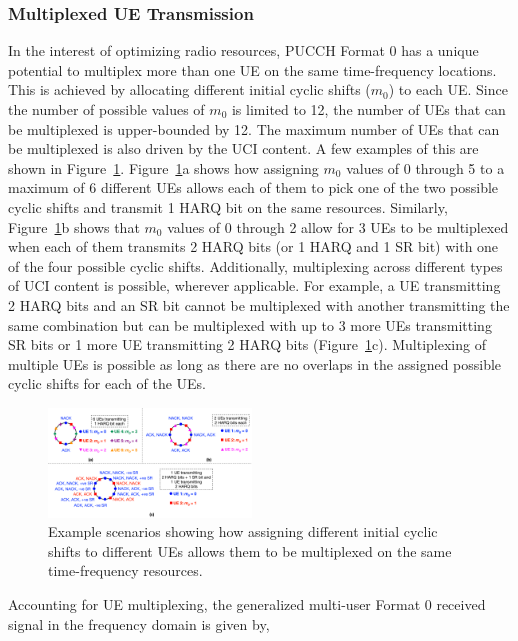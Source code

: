 \documentclass[journal]{IEEEtran}
\begin{document}
\subsubsection{Multiplexed UE Transmission}
In the interest of optimizing radio resources, PUCCH Format 0 has a unique potential to multiplex more than one UE on the same time-frequency locations. This is achieved by allocating different initial cyclic shifts ($m_0$) to each UE. Since the number of possible values of $m_0$ is limited to 12, the number of UEs that can be multiplexed is upper-bounded by 12. The maximum number of UEs that can be multiplexed is also driven by the UCI content. A few examples of this are shown in Figure~\ref{fig: m_cs_mux_ue}. Figure~\ref{fig: m_cs_mux_ue}a shows how assigning $m_0$ values of 0 through 5 to a maximum of 6 different UEs allows each of them to pick one of the two possible cyclic shifts and transmit 1 HARQ bit on the same resources. Similarly, Figure~\ref{fig: m_cs_mux_ue}b shows that $m_0$ values of 0 through 2 allow for 3 UEs to be multiplexed when each of them transmits 2 HARQ bits (or 1 HARQ and 1 SR bit) with one of the four possible cyclic shifts. Additionally, multiplexing across different types of UCI content is possible, wherever applicable. For example, a UE transmitting 2 HARQ bits and an SR bit cannot be multiplexed with another transmitting the same combination but can be multiplexed with up to 3 more UEs transmitting SR bits or 1 more UE transmitting 2 HARQ bits (Figure~\ref{fig: m_cs_mux_ue}c). Multiplexing of multiple UEs is possible as long as there are no overlaps in the assigned possible cyclic shifts for each of the UEs. 
\begin{figure}[ht]
    \centering
    \includegraphics[width=0.48\textwidth]{Figures/m_cs_table_v3.png}
    \caption{Example scenarios showing how assigning different initial cyclic shifts to different UEs allows them to be multiplexed on the same time-frequency resources.}
    \label{fig: m_cs_mux_ue}
\end{figure} 

Accounting for UE multiplexing, the generalized multi-user Format 0 received signal in the frequency domain is given by,
\end{document}
